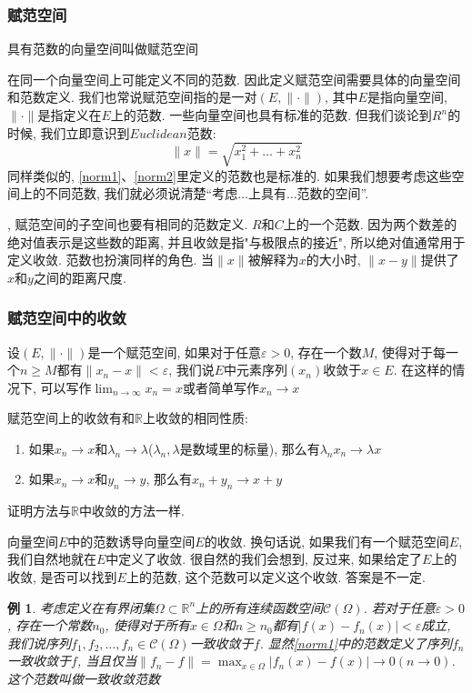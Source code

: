 \documentclass[a4paper,11pt]{article}
\theoremstyle{mystyle}
\newtheorem{example}{\hspace{2em}例}[section]
\begin{document}
\subsubsection*{赋范空间}
\begin{definition}
  具有范数的向量空间叫做赋范空间
\end{definition}
在同一个向量空间上可能定义不同的范数. 因此定义赋范空间需要具体的向量空间和范数定义. 我们也常说赋范空间指的是一对$(E,\|\cdot\|)$, 其中$E$是指向量空间, $\|\cdot\|$是指定义在$E$上的范数. 一些向量空间也具有标准的范数. 但我们谈论到$R^n$的时候, 我们立即意识到$Euclidean$范数:
\begin{equation*}
  \|x\|=\sqrt{x_1^2+\dots+x_n^2}
\end{equation*}
同样类似的, \ref{norm1}、\ref{norm2}里定义的范数也是标准的. 如果我们想要考虑这些空间上的不同范数, 我们就必须说清楚“考虑$\dots$上具有$\dots$范数的空间”.

, 赋范空间的子空间也要有相同的范数定义.
$R$和$C$上的一个范数. 因为两个数差的绝对值表示是这些数的距离, 并且收敛是指"与极限点的接近", 所以绝对值通常用于定义收敛. 范数也扮演同样的角色. 当$\|x\|$被解释为$x$的大小时, $\|x-y\|$提供了$x$和$y$之间的距离尺度.
\subsubsection*{赋范空间中的收敛}
\begin{definition}
  设$(E,\|\cdot\|)$是一个赋范空间, 如果对于任意$\varepsilon>0$, 存在一个数$M$, 使得对于每一个$n\geq M$都有$\|x_n-x\|<\varepsilon$, 我们说$E$中元素序列$(x_n)$收敛于$x\in E$. 在这样的情况下, 可以写作$\lim_{n\to \infty} x_n=x$或者简单写作$x_n\to x$
\end{definition}
赋范空间上的收敛有和$\mathbb{R}$上收敛的相同性质:
\begin{enumerate}
  \item 如果$x_n\to x$和$\lambda_n\to\lambda$($\lambda_n,\lambda$是数域里的标量), 那么有$\lambda_n x_n\to\lambda x$
  \item 如果$x_n\to x$和$y_n\to y$, 那么有$x_n+y_n\to x+y$
\end{enumerate}
证明方法与$\mathbb{R}$中收敛的方法一样.

\indent 向量空间$E$中的范数诱导向量空间$E$的收敛. 换句话说, 如果我们有一个赋范空间$E$,我们自然地就在$E$中定义了收敛. 很自然的我们会想到, 反过来, 如果给定了$E$上的收敛, 是否可以找到$E$上的范数, 这个范数可以定义这个收敛. 答案是不一定.
\begin{example}
  考虑定义在有界闭集$\Omega\subset \mathbb{R}^n$上的所有连续函数空间$\mathcal{C}(\Omega)$. 若对于任意$\varepsilon>0$, 存在一个常数$n_0$, 使得对于所有$x\in\Omega$和$n\geq n_0$都有$|f(x)-f_n(x)|<\varepsilon$成立, 我们说序列$f_1,f_2,\dots,f_n\in\mathcal{C}(\Omega)$一致收敛于$f$. 显然\ref{norm1}中的范数定义了序列$f_n$一致收敛于$f$, 当且仅当$\|f_n-f\|=\max_{x\in\Omega}|f_n(x)-f(x)|\to 0(n\to 0)$. 这个范数叫做一致收敛范数
\end{example}
\end{document}
